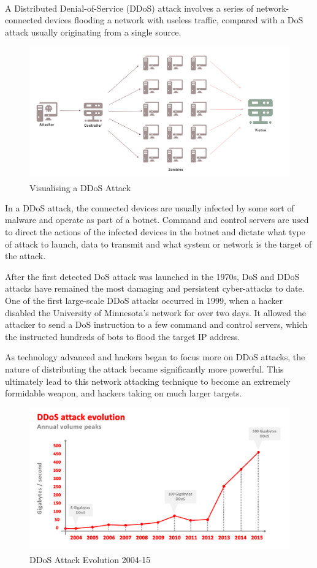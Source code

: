 \raggedright

A Distributed Denial-of-Service (DDoS)\textsuperscript{\cite{douligeris2004ddos}} attack involves a series of
network-connected devices flooding a network with useless traffic,
compared with a DoS attack usually originating from a single source.

\begin{figure}[h]
	\centering
	\includegraphics[width=0.75\linewidth]{img/ddos_attack.png}
	\caption{Visualising a DDoS Attack\textsuperscript{\cite{securebox}}}
\end{figure}

In a DDoS attack, the connected devices are usually infected by some sort of malware and operate as part of a botnet. Command and control servers are used to direct the actions of the infected devices in the botnet and dictate what type of attack to launch, data to transmit and what system or network is the target of the attack.

\vspace{0.5cm}

After the first detected DoS attack was launched in the 1970s, DoS and DDoS attacks have remained the most damaging and persistent cyber-attacks to date. One of the first large-scale DDoS attacks occurred in 1999, when a hacker disabled the University of Minnesota's network for over two days. It allowed the attacker to send a DoS instruction to a few command and control servers, which the instructed hundreds of bots to flood the target IP address.

\vspace{0.5cm}

As technology advanced and hackers began to focus more on DDoS attacks, the nature of distributing the attack became significantly more powerful. This ultimately lead to this network attacking technique to become an extremely formidable weapon, and hackers taking on much larger targets.

\begin{figure}[h]
	\centering
	\includegraphics[width=0.75\linewidth]{img/ddos_scale_time.png}
	\caption{DDoS Attack Evolution 2004-15\textsuperscript{\cite{ddosattackevolution}}}
\end{figure}


